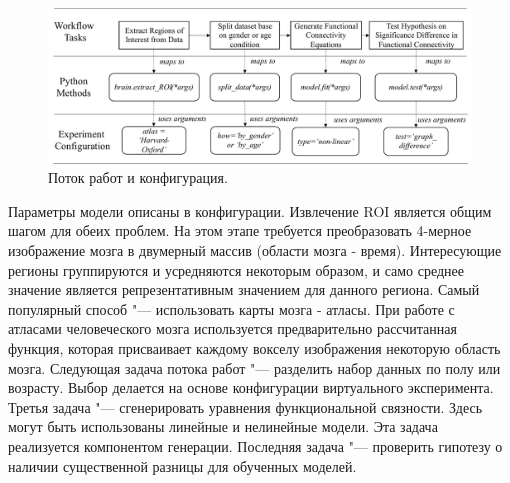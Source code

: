 \begin{figure}[ht]
    \centering
    \includegraphics[width=1.0\linewidth]{images/Workflow_conf.pdf}
    \caption{Поток работ и конфигурация.}\label{fig:workflow}
\end{figure}

Параметры модели описаны в конфигурации. Извлечение ROI является общим шагом для обеих проблем. На этом этапе требуется преобразовать 4-мерное изображение мозга в двумерный массив (области мозга - время). Интересующие регионы группируются и усредняются некоторым образом, и само среднее значение является репрезентативным значением для данного региона. Самый популярный способ "--- использовать карты мозга - атласы. При работе с атласами человеческого мозга используется предварительно рассчитанная функция, которая присваивает каждому вокселу изображения некоторую область мозга.
Следующая задача потока работ "--- разделить набор данных по полу или возрасту. Выбор делается на основе конфигурации виртуального эксперимента. Третья задача "--- сгенерировать уравнения функциональной связности. Здесь могут быть использованы линейные и нелинейные модели. Эта задача реализуется компонентом генерации. Последняя задача "--- проверить гипотезу о наличии существенной разницы для обученных моделей.



\clearpage